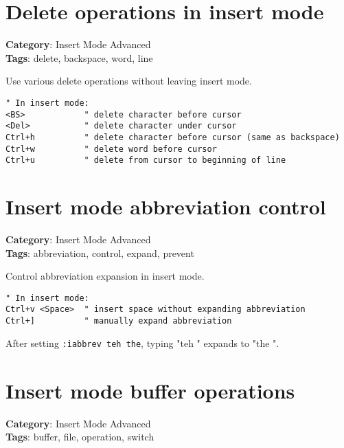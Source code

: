 {{{{{{\section{Delete operations in insert mode}

\textbf{Category}: Insert Mode Advanced\\ \textbf{Tags}: delete, backspace, word, line
\vspace{0.5cm}

Use various delete operations without leaving insert mode.

\begin{Exa*}{}
\begin{Verbatim}[fontsize=\footnotesize, breaklines, breakanywhere]
" In insert mode:
<BS>            " delete character before cursor
<Del>           " delete character under cursor
Ctrl+h          " delete character before cursor (same as backspace)
Ctrl+w          " delete word before cursor
Ctrl+u          " delete from cursor to beginning of line
\end{Verbatim}
\end{Exa*}

\section{Insert mode abbreviation control}

\textbf{Category}: Insert Mode Advanced\\ \textbf{Tags}: abbreviation, control, expand, prevent
\vspace{0.5cm}

Control abbreviation expansion in insert mode.

\begin{Exa*}{}
\begin{Verbatim}[fontsize=\footnotesize, breaklines, breakanywhere]
" In insert mode:
Ctrl+v <Space>  " insert space without expanding abbreviation
Ctrl+]          " manually expand abbreviation
\end{Verbatim}
\end{Exa*}

After setting {\footnotesize \Verb§:iabbrev teh the§}, typing "teh " expands to "the ".

\section{Insert mode buffer operations}

\textbf{Category}: Insert Mode Advanced\\ \textbf{Tags}: buffer, file, operation, switch
\vspace{0.5cm}

}}}}}}
